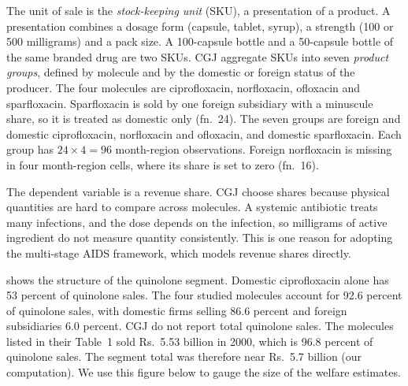 The unit of sale is the \emph{stock-keeping unit} (SKU), a presentation of a product. A presentation combines a
dosage form (capsule, tablet, syrup), a strength (100 or 500 milligrams) and a pack size. A 100-capsule bottle and a
50-capsule bottle of the same branded drug are two SKUs. CGJ aggregate SKUs into seven \emph{product groups}, defined
by molecule and by the domestic or foreign status of the producer. The four molecules are ciprofloxacin,
norfloxacin, ofloxacin and sparfloxacin. Sparfloxacin is sold by one foreign subsidiary with a minuscule share, so it
is treated as domestic only (fn.~24). The seven groups are foreign and domestic ciprofloxacin, norfloxacin and
ofloxacin, and domestic sparfloxacin. Each group has $24 \times 4 = 96$ month-region observations. Foreign norfloxacin
is missing in four month-region cells, where its share is set to zero (fn.~16).

The dependent variable is a revenue share. CGJ choose shares because physical quantities are hard to compare across
molecules. A systemic antibiotic treats many infections, and the dose depends on the infection, so milligrams of
active ingredient do not measure quantity consistently. This is one reason for adopting the multi-stage AIDS
framework, which models revenue shares directly.

 shows the structure of the quinolone segment. Domestic ciprofloxacin alone has 53 percent of
quinolone sales. The four studied molecules account for 92.6 percent of quinolone sales, with domestic firms selling
86.6 percent and foreign subsidiaries 6.0 percent. CGJ do not report total quinolone sales.
The molecules listed in their Table~1 sold Rs.~5.53 billion in 2000, which is 96.8 percent of quinolone sales. The
segment total was therefore near Rs.~5.7 billion (our computation). We use this figure below to gauge the size of
the welfare estimates.

